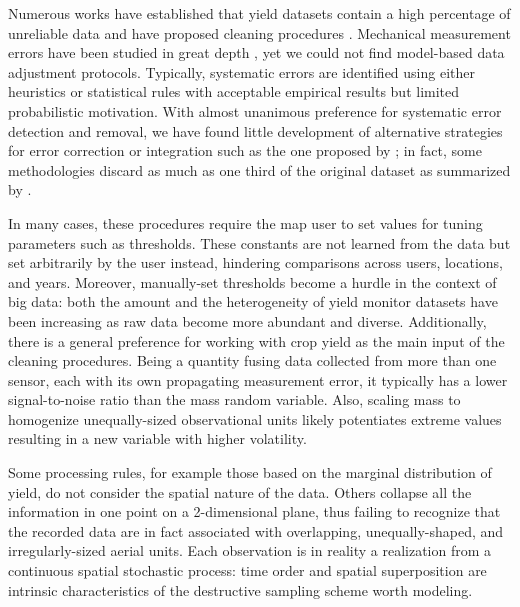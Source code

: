 Numerous works have established that yield datasets contain a high
percentage of unreliable data and have proposed cleaning procedures
\citep{Blackmore1996, Moore1998, Blackmore1999, Thylen2000, Noack2003,
  Simbahan2004, Ping2005, Sudduth2007, Sudduth2012, Spekken2013,
  Leroux2018, Leroux2019, Vega2019}. Mechanical measurement errors
have been studied in great depth \citep{Arslan1999, Arslan2002,
  Grisso2002, Burks2004, Hemming2005, Fulton2009, Schuster2017}, yet
we could not find model-based data adjustment protocols. Typically,
systematic errors are identified using either heuristics or
statistical rules with acceptable empirical results but limited
probabilistic motivation. With almost unanimous preference for
systematic error detection and removal, we have found little
development of alternative strategies for error correction or
integration such as the one proposed by \cite{Bachmaier2007,
  Bachmaier2010}; in fact, some methodologies discard as much as one
third of the original dataset as summarized by \cite{Lyle2013}.

In many cases, these procedures require the map user to set values for
tuning parameters such as thresholds. These constants are not learned
from the data but set arbitrarily by the user instead, hindering
comparisons across users, locations, and years. Moreover, manually-set
thresholds become a hurdle in the context of big data: both the amount
and the heterogeneity of yield monitor datasets have been increasing
as raw data become more abundant and diverse. Additionally, there is a
general preference for working with crop yield as the main input of
the cleaning procedures. Being a quantity fusing data collected from
more than one sensor, each with its own propagating measurement error,
it typically has a lower signal-to-noise ratio than the mass random
variable. Also, scaling mass to homogenize unequally-sized
observational units likely potentiates extreme values resulting in a
new variable with higher volatility.

Some processing rules, for example those based on the marginal
distribution of yield, do not consider the spatial nature of the
data. Others collapse all the information in one point on a
2-dimensional plane, thus failing to recognize that the recorded data
are in fact associated with overlapping, unequally-shaped, and
irregularly-sized aerial units. Each observation is in reality a
realization from a continuous spatial stochastic process: time
order and spatial superposition are intrinsic characteristics of the
destructive sampling scheme worth modeling.

